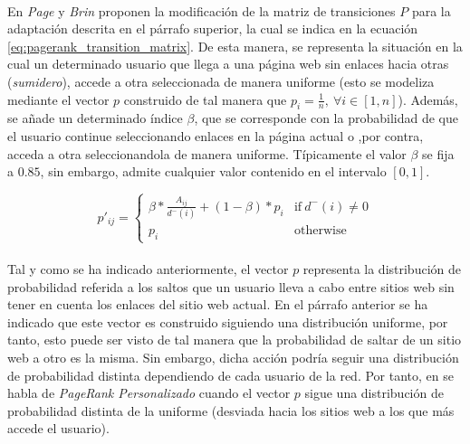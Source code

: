 \documentclass{subfiles}
\begin{document}
      \paragraph{}
      En \cite{page1999pagerank} \emph{Page} y \emph{Brin} proponen la modificación de la matriz de transiciones $P$ para la adaptación descrita en el párrafo superior, la cual se indica en la ecuación \eqref{eq:pagerank_transition_matrix}. De esta manera, se representa la situación en la cual un determinado usuario que llega a una página web sin enlaces hacia otras (\emph{sumidero}), accede a otra seleccionada de manera uniforme (esto se modeliza mediante el vector $p$ construido de tal manera que  $p_{i} = \frac{1}{n}, \ \forall i \in [1,n]$). Además, se añade un determinado índice $\beta$, que se corresponde con la probabilidad de que el usuario continue seleccionando enlaces en la página actual o ,por contra, acceda a otra seleccionandola de manera uniforme. Típicamente el valor $\beta$ se fija a $0.85$, sin embargo, admite cualquier valor contenido en el intervalo $[0,1]$.

      \begin{equation}
      \label{eq:pagerank_transition_matrix}
        p'_{ij} =
        \begin{cases}
          \beta * \frac{A_{ij}}{d^-(i)} + (1- \beta) * p_{i} & \mbox{if} \ d^-(i) \neq 0 \\
          p_{i}&\mbox{otherwise}
        \end{cases}
      \end{equation}

      \paragraph{}
      Tal y como se ha indicado anteriormente, el vector $p$ representa la distribución de probabilidad referida a los saltos que un usuario lleva a cabo entre sitios web sin tener en cuenta los enlaces del sitio web actual. En el párrafo anterior se ha indicado que este vector es construido siguiendo una distribución uniforme, por tanto, esto puede ser visto de tal manera que la probabilidad de saltar de un sitio web a otro es la misma. Sin embargo, dicha acción podría seguir una distribución de probabilidad distinta dependiendo de cada usuario de la red. Por tanto, en \cite{page1999pagerank} se habla de \emph{PageRank Personalizado} cuando el vector $p$ sigue una distribución de probabilidad distinta de la uniforme (desviada hacia los sitios web a los que más accede el usuario).
\end{document}
